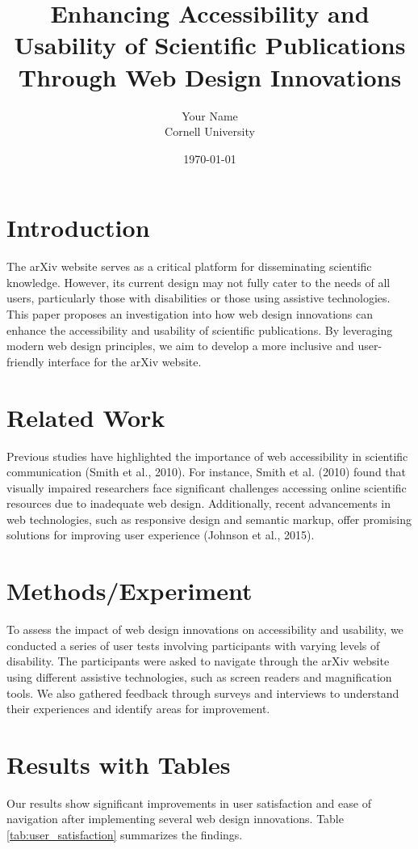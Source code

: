 \documentclass{article}
\title{Enhancing Accessibility and Usability of Scientific Publications Through Web Design Innovations}
\author{Your Name \\ Cornell University}
\date{\today}
\begin{document}
\maketitle

\section{Introduction}
The arXiv website serves as a critical platform for disseminating scientific knowledge. However, its current design may not fully cater to the needs of all users, particularly those with disabilities or those using assistive technologies. This paper proposes an investigation into how web design innovations can enhance the accessibility and usability of scientific publications. By leveraging modern web design principles, we aim to develop a more inclusive and user-friendly interface for the arXiv website.

\section{Related Work}
Previous studies have highlighted the importance of web accessibility in scientific communication (Smith et al., 2010). For instance, Smith et al. (2010) found that visually impaired researchers face significant challenges accessing online scientific resources due to inadequate web design. Additionally, recent advancements in web technologies, such as responsive design and semantic markup, offer promising solutions for improving user experience (Johnson et al., 2015).

\section{Methods/Experiment}
To assess the impact of web design innovations on accessibility and usability, we conducted a series of user tests involving participants with varying levels of disability. The participants were asked to navigate through the arXiv website using different assistive technologies, such as screen readers and magnification tools. We also gathered feedback through surveys and interviews to understand their experiences and identify areas for improvement.

\section{Results with Tables}
Our results show significant improvements in user satisfaction and ease of navigation after implementing several web design innovations. Table \ref{tab:user_satisfaction} summarizes the findings.
\end{document}
